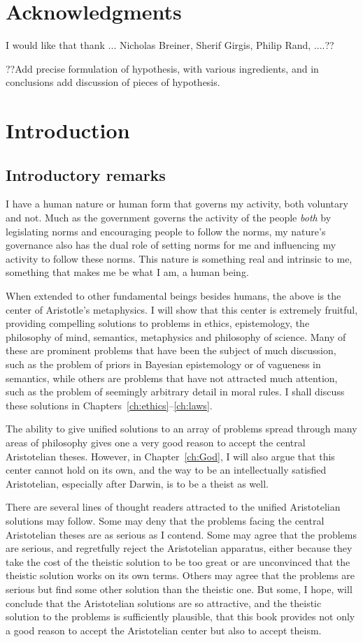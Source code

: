 \def\mychapter{I}

\chapter*{Acknowledgments}
I would like that thank ... Nicholas Breiner, Sherif Girgis, Philip Rand, ....??

??Add precise formulation of hypothesis, with various ingredients, and in conclusions add discussion of pieces of hypothesis.

\chapter{Introduction}\label{ch:intro}
\section{Introductory remarks}
I have a human nature or human form that governs my activity, both voluntary and not.
Much as the government governs the activity of the people \textit{both} by legislating norms and encouraging
people to follow the norms, my nature's governance also has the dual role of setting norms for me and influencing my
activity to follow these norms. This nature is something real and intrinsic to me, something that makes me be what I am, 
a human being. 

When extended to other fundamental beings besides humans, the above is the center of Aristotle's metaphysics.
I will show that this center is extremely fruitful, providing compelling solutions to problems in ethics,
epistemology, the philosophy of mind, semantics, metaphysics and philosophy of science. Many of these are prominent problems that have been
the subject of much discussion, such as the problem of priors in Bayesian epistemology or of vagueness in semantics, while others 
are problems
that have not attracted much attention, such as the problem of seemingly arbitrary detail in moral rules. 
I shall discuss these solutions in Chapters~\ref{ch:ethics}--\ref{ch:laws}.

The ability to give unified solutions to an array of problems spread through many areas of philosophy gives one
a very good reason to accept the central Aristotelian theses. However, in Chapter~\ref{ch:God}, I will also argue that this center cannot 
hold on its own, and the way to be an intellectually satisfied Aristotelian, especially after Darwin, is to be a theist 
as well.

There are several lines of thought readers attracted to the unified Aristotelian solutions may  follow. Some
may deny that the problems facing the central Aristotelian theses are as serious as I contend. Some may agree that
the problems are serious, and regretfully reject the Aristotelian apparatus, either because they take the cost of 
the theistic solution to be too great or are unconvinced that the theistic solution works on its own terms. 
Others may agree that the problems are serious but find some other solution than the theistic one. But some, I hope, 
will conclude that the Aristotelian solutions are so attractive, and the theistic solution to the problems is sufficiently 
plausible, that this book provides not only a good reason to accept the Aristotelian center but also to accept
theism.

